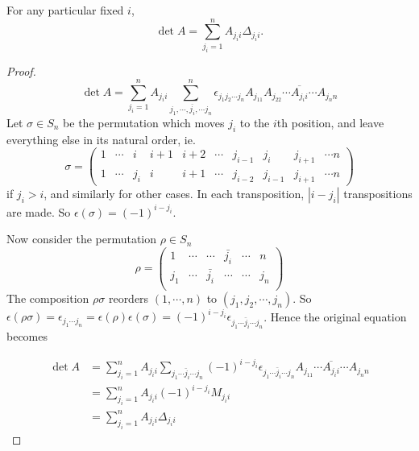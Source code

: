 \documentclass[a4paper]{article}
\begin{document}
\begin{thm}
  For any particular fixed $i$,
  \[
    \det A = \sum_{j_i = 1}^{n} A_{j_ii}\Delta_{j_ii}.
  \]
\end{thm}
\begin{proof}
  \[
    \det A = \sum_{j_i = 1}^nA_{j_ii} \sum_{j_1, \cdots, \overline{j_i}, \cdots j_n}^n \epsilon_{j_1j_2\cdots j_n} A_{j_11}A_{j_22}\cdots \overline{A_{j_ii}}\cdots A_{j_nn}
  \]
  Let $\sigma \in S_n$ be the permutation which moves $j_i$ to the $i$th position, and leave everything else in its natural order, ie.
  \[
    \sigma =
    \begin{pmatrix}
      1 &\cdots& i & i + 1 & i + 2 & \cdots &j_{i - 1}&j_i& j_{i + 1} & \cdots n\\
      1 & \cdots & j_i & i & i + 1 & \cdots & j_{i - 2} & j_{i - 1} & j_{i + 1} & \cdots n
    \end{pmatrix}
  \]
  if $j_i > i$, and similarly for other cases. In each transposition, $|i - j_i|$ transpositions are made. So $\epsilon(\sigma) = (-1)^{i - j_i}$.

  Now consider the permutation $\rho\in S_n$
  \[
    \rho =
    \begin{pmatrix}
      1 & \cdots & \cdots & \bar {j_i} & \cdots & n\\
      j_1 & \cdots & \bar{j_i} & \cdots & \cdots & j_n\\
    \end{pmatrix}
  \]
  The composition $\rho\sigma$ reorders $(1, \cdots, n)$  to $(j_1, j_2,\cdots, j_n)$. So $\epsilon(\rho\sigma) = \epsilon_{j_1\cdots j_n} = \epsilon(\rho)\epsilon(\sigma) = (-1)^{i - j_i} \epsilon_{j_1\cdots \bar j_i \cdots j_n}$. Hence the original equation becomes

  \begin{align*}
    \det A &= \sum_{j_i = 1}^n A_{j_i i} \sum_{j_1\cdots \bar j_i\cdots j_n}(-1)^{i - j_i} \epsilon_{j_1\cdots \bar j_i \cdots j_n} A_{j_11}\cdots \overline{A_{j_ii}} \cdots A_{j_nn}\\
    &= \sum_{j_i = 1}^n A_{j_ii} (-1)^{i - j_i}M_{j_ii}\\
    &= \sum_{j_i = 1}^{n} A_{j_ii}\Delta_{j_ii}
  \end{align*}
\end{proof}
\end{document}
